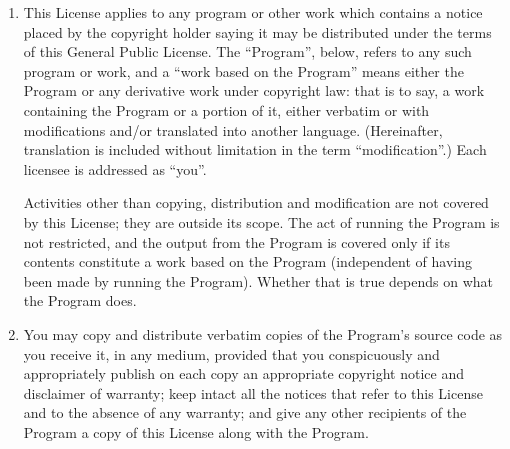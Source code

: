 \begin{enumerate}
\addtocounter{enumi}{-1}
\item
  This License applies to any program or other work which contains a notice placed by the copyright holder saying it may be distributed under the terms of this General Public License. The ``Program'', below, refers to any such program or work, and a ``work based on the Program'' means either the Program or any derivative work under copyright law: that is to say, a work containing the Program or a portion of it, either verbatim or with modifications and/or translated into another language. (Hereinafter, translation is included without limitation in the term ``modification''.) Each licensee is addressed as ``you''.

  Activities other than copying, distribution and modification are not covered by this License; they are outside its scope. The act of running the Program is not restricted, and the output from the Program is covered only if its contents constitute a work based on the Program (independent of having been made by running the Program). Whether that is true depends on what the Program does.
\item
  You may copy and distribute verbatim copies of the Program's source code as you receive it, in any medium, provided that you conspicuously and appropriately publish on each copy an appropriate copyright notice and disclaimer of warranty; keep intact all the notices that refer to this License and to the absence of any warranty; and give any other recipients of the Program a copy of this License along with the Program.


\end{enumerate}
